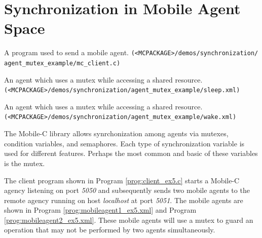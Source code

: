 \documentclass[11pt]{report}
\begin{document}
\section{Synchronization in Mobile Agent Space}
\begin{Program}[!t]
\begin{center}
   {\footnotesize \linespread{1.0} 
     }
\end{center}
\caption{A program used to send a mobile agent. 
  \texttt{(<MCPACKAGE>/demos/synchronization/ agent\_mutex\_example/mc\_client.c)}}
\label{prog:client_ex5.c}
\end{Program}
\begin{Program}[!t]
\begin{center}
   {\footnotesize \linespread{1.0} 
     }
\end{center}
\caption{An agent which uses a mutex while accessing a shared resource.
  \texttt{(<MCPACKAGE>/demos/synchronization/agent\_mutex\_example/sleep.xml)} }
\label{prog:mobileagent1_ex5.xml}
\end{Program}
\begin{Program}[!t]
\begin{center}
   {\footnotesize \linespread{1.0} }
\end{center}
\caption{An agent which uses a mutex while accessing a shared resource.
  \texttt{(<MCPACKAGE>/demos/synchronization/agent\_mutex\_example/wake.xml)} }
\label{prog:mobileagent2_ex5.xml}
\end{Program}

The Mobile-C library allows synrchonization among agents via
mutexes, condition variables, and semaphores. Each type of synchronization
variable is used for different features. Perhaps the most common and basic
of these variables is the mutex.

The client program shown in Program \vref{prog:client_ex5.c} starts a Mobile-C
agency listening on port \textit{5050} and subsequently sends two mobile 
agents to 
the remote agency running on host \textit{localhost} at port 
\textit{5051}.
The mobile agents are shown in Program \vref{prog:mobileagent1_ex5.xml} 
and Program \vref{prog:mobileagent2_ex5.xml}. These mobile agents will use
a mutex to guard an operation that may not be performed by two agents
simultaneously.
\end{document}
